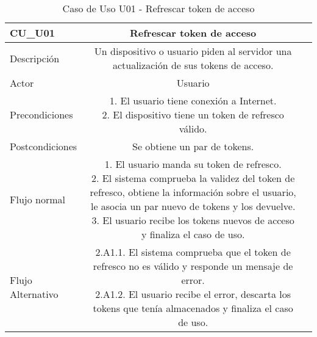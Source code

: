 \begin{table}[]
\centering
	\setlength{\extrarowheight}{3pt}
		\begin{tabular}{rc{1.85cm}|c{8cm}}
	    \hline
        \multicolumn{1}{|l}{CU_U01}     & \multicolumn{1}{Y|}{\textbf{Refrescar token de acceso}  } \\
	    \hline \hline
	    \multicolumn{1}{|l}{Descripción}     & \multicolumn{1}{Y|}{
	    Un dispositivo o usuario piden al servidor una actualización de sus tokens de acceso.
	    }  \\ \cline{1-2}
	    \multicolumn{1}{|l}{Actor}           & \multicolumn{1}{Y|}{Usuario}  \\ \cline{1-2}
	    \multicolumn{1}{|l}{Precondiciones}  & \multicolumn{1}{Y|}{
1. El usuario tiene conexión a Internet.\newline
2. El dispositivo tiene un token de refresco válido.}  \\ \cline{1-2}
	    \multicolumn{1}{|l}{Postcondiciones} & \multicolumn{1}{Y|}{Se obtiene un par de tokens.}\\ \cline{1-2}
	    \multicolumn{1}{|l}{Flujo normal}    & \multicolumn{1}{Y|}{
1. El usuario manda su token de refresco. \newline
2. El sistema comprueba la validez del token de refresco, obtiene la información sobre el usuario, le asocia un par nuevo de tokens y los devuelve. \newline
3. El usuario recibe los tokens nuevos de acceso y finaliza el caso de uso.
	    } \\ \cline{1-2}
	    \multicolumn{1}{|l}{Flujo Alternativo} & \multicolumn{1}{Y|}{
2.A1.1. El sistema comprueba que el token de refresco no es válido y responde un mensaje de error. \newline
2.A1.2. El usuario recibe el error, descarta los tokens que tenía almacenados y finaliza el caso de uso.
}\\ \cline{1-2}
	    \hline
	    \end{tabular}
	\label{table:cu_u01}
	\caption{Caso de Uso U01 - Refrescar token de acceso}
\end{table}



